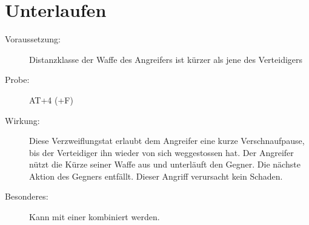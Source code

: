 \section{Unterlaufen}
\label{bAT.unterlaufen}
\begin{description}
    \item[Voraussetzung:]
        Distanzklasse der Waffe des Angreifers ist kürzer als jene des Verteidigers
    \item[Probe:]
        AT+4 (+F)
    \item[Wirkung:]
        Diese Verzweiflungstat erlaubt dem Angreifer eine kurze Verschnaufpause, bis der Verteidiger ihn wieder von sich weggestossen hat.
        Der Angreifer nützt die Kürze seiner Waffe aus und unterläuft den Gegner.
        Die nächste Aktion des Gegners entfällt.
        Dieser Angriff verursacht kein Schaden.
    \item[Besonderes:]
        Kann mit einer  kombiniert werden.
\end{description}


